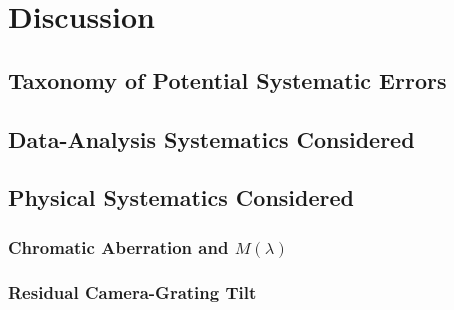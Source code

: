 \chapter{Discussion}
\label{chap:discussion}


\section{Taxonomy of Potential Systematic Errors}
\label{sec:discussion-taxonomy}


\section{Data-Analysis Systematics Considered}
\label{sec:discussion-data-analysis}


\section{Physical Systematics Considered}
\label{sec:discussion-physical}

\subsection{Chromatic Aberration and $M(\lambda)$}
\label{sec:discussion-chromatic-aberration}


\subsection{Residual Camera-Grating Tilt}
\label{sec:discussion-residual-tilt}

